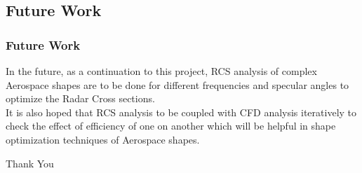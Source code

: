 \documentclass{beamer}
\begin{document}
\begin{frame}
 \section{Future Work}
 \frametitle{Future Work}
 In the future, as a continuation to this project, RCS analysis of complex Aerospace shapes are to be done for different frequencies and specular angles to optimize the Radar Cross sections. \\
 It is also hoped that RCS analysis to be coupled with CFD analysis iteratively to check the effect of efficiency of one on another which will be helpful in shape optimization techniques of Aerospace shapes.
\end{frame}



\begin{frame}
\Huge{\centerline{Thank You}}
\end{frame}

\end{document}
